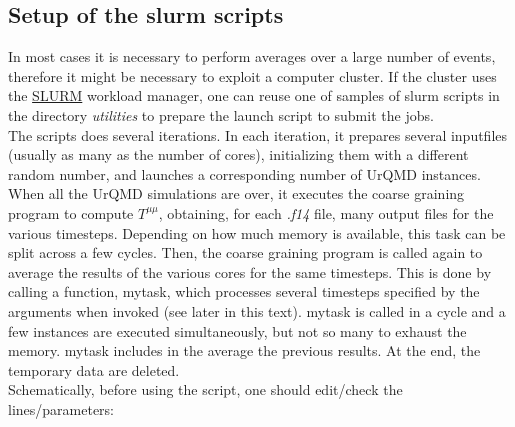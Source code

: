 \documentclass[12pt, a4paper]{article}
\begin{document}
\subsection{Setup of the slurm scripts}
In most cases it is necessary to perform averages over a large number of events, therefore it might be necessary to exploit a computer cluster. If the cluster uses the \href{https://slurm.schedmd.com/documentation.html}{SLURM} workload manager, one can reuse one of samples of slurm scripts in the directory \emph{utilities} to prepare the launch script to submit the jobs.\\
The scripts does several iterations. In each iteration, it prepares several inputfiles (usually as many as the number of cores), initializing them with a different random number, and launches a corresponding number of UrQMD instances. When all the UrQMD simulations are over, it executes the coarse graining program to compute $T^{\mu \mu}$, obtaining, for each \emph{.f14} file, many output files for the various timesteps. Depending on how much memory is available, this task can be split across a few cycles. Then, the coarse graining program is called again to average the results of the various cores for the same timesteps. This is done by calling a function, mytask, which processes several timesteps specified by the arguments when invoked (see later in this text). mytask is called in a cycle and a few instances are executed simultaneously, but not so many to exhaust the memory. mytask includes in the average the previous results. At the end, the temporary data are deleted.\\
Schematically, before using the script, one should edit/check the lines/parameters:
\end{document}
